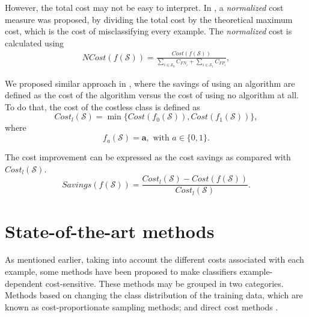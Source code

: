 However, the total cost may not be easy to interpret. In \citep{Whitrow2008}, a 
	\textit{normalized} cost measure was proposed, by dividing the total cost by the theoretical 
	maximum cost, which is the cost of misclassifying every example. The \textit{normalized} cost is 
	calculated using
  \begin{align}\label{eq:ncost}
    NCost(f(\mathcal{S})) = \frac{Cost(f(\mathcal{S}))}
    {\sum_{i \in \mathcal{S}_0} C_{FN_i} + 
    \sum_{i \in \mathcal{S}_1} C_{FP_i}},
  \end{align} 
  
	We proposed similar approach in \citep{CorreaBahnsen2014b}, where the savings of using an 
	algorithm  are defined as the cost of the algorithm versus the cost of using no algorithm at all. 
	To do that, the cost of the costless class is defined as 
	\begin{equation}
		Cost_l(\mathcal{S}) = \min \{Cost(f_0(\mathcal{S})), Cost(f_1(\mathcal{S}))\},
	\end{equation}
	where 
	\begin{equation}\label{eq:f_a}
		f_a(\mathcal{S}) = \mathbf{a}, \text{ with } a\in \{0,1\}.
	\end{equation}

	The cost improvement can be expressed as the cost savings as compared with $Cost_l(\mathcal{S})$. 
  \begin{equation}\label{eq:savings}
    Savings(f(\mathcal{S})) = \frac{ Cost_l(\mathcal{S}) - Cost(f(\mathcal{S}))}
		{Cost_l(\mathcal{S})}.
  \end{equation} 


\section{State-of-the-art methods}

	  As mentioned earlier, taking into account the different costs associated with each example, 
	  some methods have been proposed to make classifiers example-dependent cost-sensitive. These 
		methods may be grouped in two categories. Methods based on changing the class distribution of 
		the training data, which are known as cost-proportionate sampling methods; and direct cost 
		methods \citep{Wang2013}.
  
